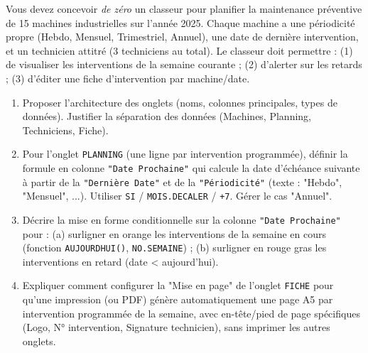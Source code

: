 \documentclass[11pt]{article}
\begin{document}
\begin{exercice}
Vous devez concevoir \textit{de zéro} un classeur pour planifier la maintenance préventive de 15 machines industrielles sur l'année 2025. Chaque machine a une périodicité propre (Hebdo, Mensuel, Trimestriel, Annuel), une date de dernière intervention, et un technicien attitré (3 techniciens au total). Le classeur doit permettre : (1) de visualiser les interventions de la semaine courante ; (2) d'alerter sur les retards ; (3) d'éditer une fiche d'intervention par machine/date.

\begin{enumerate}
    \item Proposer l'architecture des onglets (noms, colonnes principales, types de données). Justifier la séparation des données (Machines, Planning, Techniciens, Fiche).
    \item Pour l'onglet \texttt{PLANNING} (une ligne par intervention programmée), définir la formule en colonne \texttt{"Date Prochaine"} qui calcule la date d'échéance suivante à partir de la \texttt{"Dernière Date"} et de la \texttt{"Périodicité"} (texte : "Hebdo", "Mensuel", ...). Utiliser \texttt{SI} / \texttt{MOIS.DECALER} / \texttt{+7}. Gérer le cas "Annuel".
    \item Décrire la mise en forme conditionnelle sur la colonne \texttt{"Date Prochaine"} pour : (a) surligner en orange les interventions de la semaine en cours (fonction \texttt{AUJOURDHUI()}, \texttt{NO.SEMAINE}) ; (b) surligner en rouge gras les interventions en retard (date < aujourd'hui).
    \item Expliquer comment configurer la "Mise en page" de l'onglet \texttt{FICHE} pour qu'une impression (ou PDF) génère automatiquement une page A5 par intervention programmée de la semaine, avec en-tête/pied de page spécifiques (Logo, N° intervention, Signature technicien), sans imprimer les autres onglets.
\end{enumerate}
\end{exercice}
\end{document}
